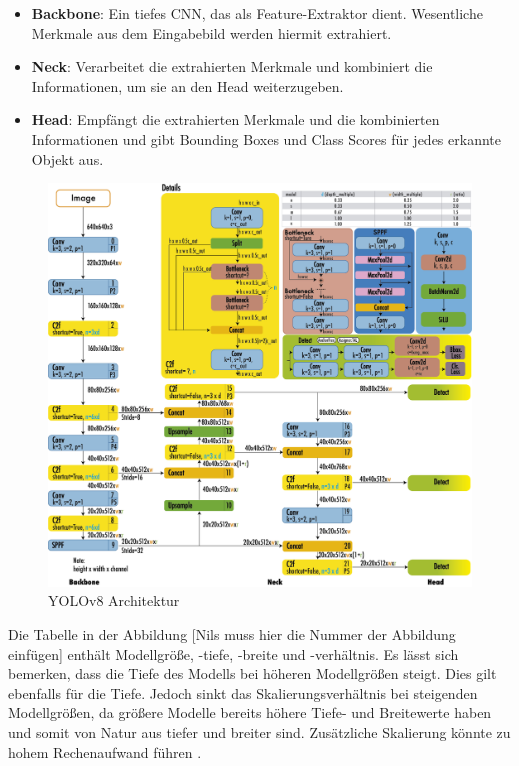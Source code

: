 \documentclass[a4paper,12pt]{article}
\begin{document}
\begin{itemize}
    \item \textbf{Backbone}: Ein tiefes CNN, das als Feature-Extraktor dient. Wesentliche Merkmale aus dem Eingabebild werden hiermit extrahiert.
    \item \textbf{Neck}: Verarbeitet die extrahierten Merkmale und kombiniert die Informationen, um sie an den Head weiterzugeben.
    \item \textbf{Head}: Empfängt die extrahierten Merkmale und die kombinierten Informationen und gibt Bounding Boxes und Class Scores für jedes erkannte Objekt aus.
\end{itemize}

\FloatBarrier
\begin{figure}[h]
    \centering
    \includegraphics[width=\textwidth]{Bild6.png}
    \caption{YOLOv8 Architektur}
    \label{fig:bild6}
\end{figure}
\FloatBarrier

\noindent Die Tabelle in der Abbildung [Nils muss hier die Nummer der Abbildung einfügen] enthält Modellgröße, -tiefe, -breite und -verhältnis. Es lässt sich bemerken, dass die Tiefe des Modells bei höheren Modellgrößen steigt. Dies gilt ebenfalls für die Tiefe. Jedoch sinkt das Skalierungsverhältnis bei steigenden Modellgrößen, da größere Modelle bereits höhere Tiefe- und Breitewerte haben und somit von Natur aus tiefer und breiter sind. Zusätzliche Skalierung könnte zu hohem Rechenaufwand führen \cite{terven2023comprehensive}.
\end{document}
